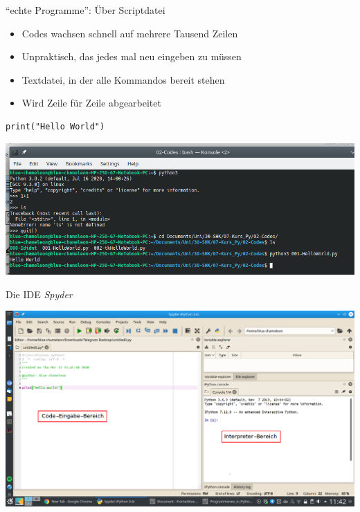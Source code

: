 \begin{frame}[fragile]{\enquote{echte Programme}: Über Scriptdatei}
%
\begin{minipage}[t]{.29\linewidth}
\vspace{0pt}
\begin{itemize}
\item Codes wachsen schnell auf mehrere Tausend Zeilen
\item Unpraktisch, das jedes mal neu eingeben zu müssen
\item[\Thus] Textdatei, in der alle Kommandos bereit stehen
\item Wird Zeile für Zeile abgearbeitet
\end{itemize}
\end{minipage}
%
%
\begin{minipage}[t]{.69\linewidth}
\vspace{0pt}
\begin{codebox}
\begin{verbatim}
print("Hello World")
\end{verbatim}
\end{codebox}
\includegraphics[width=\linewidth]{./gfx/print-HelloWorld-Run}
\end{minipage}
%
\end{frame}


\begin{frame}[fragile]{Die IDE \emph{Spyder}}
%
\begin{center}
\includegraphics[width=.8\linewidth]{./gfx/Spyder}
\end{center}
%
\end{frame}

